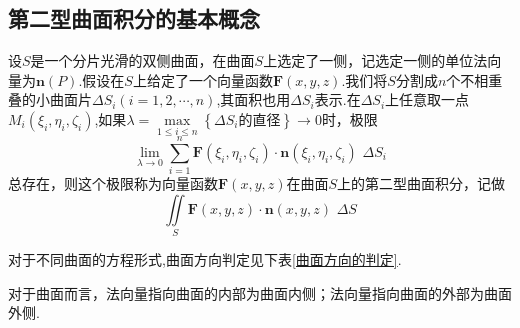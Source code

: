 \subsection{第二型曲面积分的基本概念}
设$S$是一个分片光滑的双侧曲面，在曲面$S$上选定了一侧，记选定一侧的单位法向量为$\bm{n}(P)$.假设在$S$上给定了一个向量函数$\bm{F}(x,y,z)$.我们将$S$分割成$n$个不相重叠的小曲面片$\Delta S_i(i=1,2,\cdots,n)$,其面积也用$\Delta S_i$表示.在$\Delta S_i$上任意取一点$M_i(\xi_i,\eta_i,\zeta_i)$,如果$\lambda = \max\limits_{1 \le i \le n} \left\lbrace \Delta S_i\mbox{的直径}\right\rbrace \rightarrow 0$时，极限
\begin{equation}
\lim_{\lambda \rightarrow 0} \sum^{n}_{i=1} \bm{F}(\xi_i,\eta_i,\zeta_i)\cdot \bm{n}(\xi_i,\eta_i,\zeta_i)\,\,\Delta S_i
\end{equation}
总存在，则这个极限称为向量函数$\bm{F}(x,y,z)$在曲面$S$上的第二型曲面积分，记做
\begin{equation}
\iint\limits_{S} \bm{F}(x,y,z)\cdot \bm{n}(x,y,z)\,\,\Delta S
\end{equation}

\tdefination[曲面的方向]
对于不同曲面的方程形式,曲面方向判定见下表\ref{曲面方向的判定}.
\begin{table}[!htb]
	\centering
	\caption{曲面方向的判定}
	\label{曲面方向的判定}
\end{table} 
\par 对于曲面而言，法向量指向曲面的内部为曲面内侧；法向量指向曲面的外部为曲面外侧.



